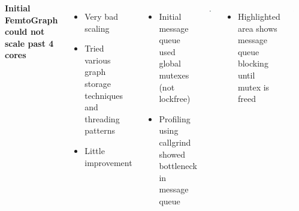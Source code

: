 \documentclass[25pt, portrait,  margin=0mm, innermargin=15mm,
  blockverticalspace=15mm, colspace=15mm, subcolspace=8mm]{tikzposter}
\begin{document}
\begin{columns}
{    }
     {
      \textbf{Initial FemtoGraph could not scale past 4 cores}
      \begin{itemize}
      \item  Very bad scaling
      \item Tried various graph storage techniques and threading patterns
      \item Little improvement
      \end{itemize}
      \begin{itemize}
      \item Initial message queue used global mutexes (not lockfree) 
      \item Profiling using callgrind showed bottleneck in message queue
      \end{itemize}
      \setcounter{figurecounter}{98}
      \begin{tikzfigure}
        \includegraphics[width=0.85\linewidth]{callgrind.png}
      \end{tikzfigure}
      \begin{itemize}
      \item Highlighted area shows message queue blocking until mutex is freed
      \end{itemize}
      

      }
    
     {
      \setcounter{figurecounter}{98}
      \begin{tikzfigure}
        \includegraphics[width=0.95\linewidth]{vs.png}
        \end{tikzfigure}


}
\end{columns}
\end{document}
